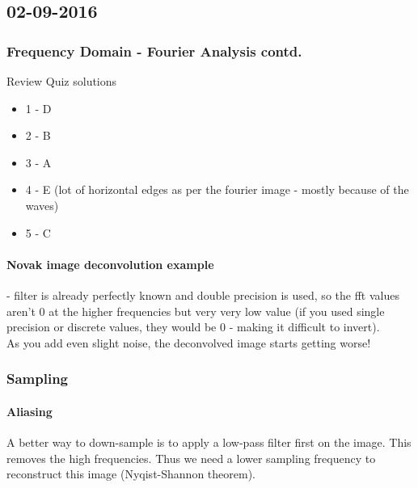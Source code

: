 \subsection{02-09-2016}
\subsubsection{Frequency Domain - Fourier Analysis contd.}
Review Quiz solutions
\begin{itemize}
	\item 1 - D
	\item 2 - B
	\item 3 - A
	\item 4 - E (lot of horizontal edges as per the fourier image - mostly because of the waves)
	\item 5 - C
\end{itemize}
\paragraph {Novak image deconvolution example} - filter is already perfectly known and double precision is used, so the fft values aren't 0 at the higher frequencies but very very low value (if you used single precision or discrete values, they would be 0 - making it difficult to invert).\\
As you add even slight noise, the deconvolved image starts getting worse!

\subsubsection{Sampling}
\paragraph{Aliasing} A better way to down-sample is to apply a low-pass filter first on the image. This removes the high frequencies. Thus we need a lower sampling frequency to reconstruct this image (Nyqist-Shannon theorem).
